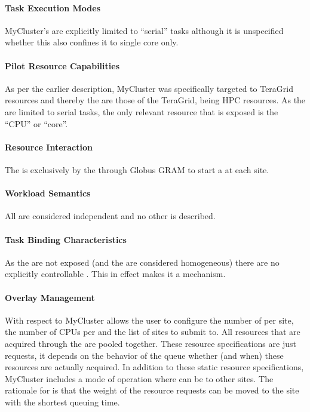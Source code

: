 \documentclass{sig-alternate}
\begin{document}
\paragraph{Task Execution Modes}

MyCluster's  are explicitly limited to
``serial'' tasks although it is unspecified whether this also confines
it to single core  only.

\paragraph{Pilot Resource Capabilities}

As per the earlier description, MyCluster was specifically targeted to
TeraGrid resources and thereby the  are those
of the TeraGrid, being HPC resources. As the  are
limited to serial tasks, the only relevant resource that is exposed is the
``CPU'' or ``core''.

\paragraph{Resource Interaction}

The  is exclusively by the 
through Globus GRAM to start a  at each site.

\paragraph{Workload Semantics}

All  are considered independent and no other  is described.

\paragraph{Task Binding Characteristics}

As the \pilots are not exposed (and the  are considered
homogeneous) there are no explicitly controllable . This in effect makes it a  mechanism.

\paragraph{Overlay Management}

With respect to  MyCluster allows the user to
configure the number of  per site, the number of CPUs per
 and the list of sites to submit to. All resources that are
acquired through the  are pooled together. These
resource specifications are just requests, it depends on the behavior of the
queue whether (and when) these resources are actually acquired. In addition to
these static resource specifications, MyCluster includes a mode of operation
where  can be  to other sites. The rationale
for  is that the weight of the resource requests can be
moved to the site with the shortest queuing time.
\end{document}
